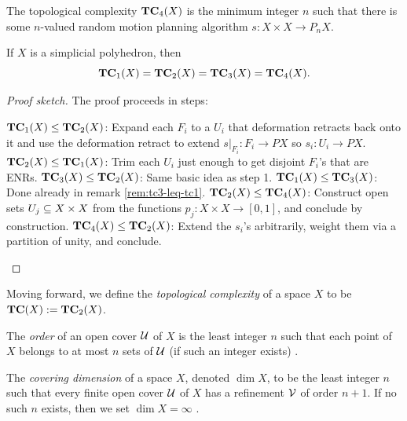 \begin{definition}
    The topological complexity $\operatorname{\mathbf{TC}}_4(X)$ is the minimum integer $n$ such that there is some $n$-valued random motion planning algorithm $s : X \times X \to P_n X$.
\end{definition}

\begin{theorem}
    If $X$ is a simplicial polyhedron, then
    \[
        \operatorname{\mathbf{TC}}_1(X) = \operatorname{\mathbf{TC}}_2(X) = \operatorname{\mathbf{TC}}_3(X) = \operatorname{\mathbf{TC}}_4(X).
    \]
    \begin{proof}[Proof sketch]
        The proof proceeds in steps:

        \begin{enumerate}[Step]
             $\operatorname{\mathbf{TC}}_1(X) \leq \operatorname{\mathbf{TC}}_2(X)$:
                Expand each $F_i$ to a $U_i$ that deformation retracts back onto it and use the deformation retract to extend $s |_{F_i} : F_i \to PX$ so $s_i : U_i \to PX$.
             $\operatorname{\mathbf{TC}}_2(X) \leq \operatorname{\mathbf{TC}}_1(X)$:
                Trim each $U_i$ just enough to get disjoint $F_i$'s that are ENRs.
             $\operatorname{\mathbf{TC}}_3(X) \leq \operatorname{\mathbf{TC}}_2(X)$:
                Same basic idea as step 1.
             $\operatorname{\mathbf{TC}}_1(X) \leq \operatorname{\mathbf{TC}}_3(X)$:
                Done already in remark \ref{rem:tc3-leq-tc1}.
             $\operatorname{\mathbf{TC}}_2(X) \leq \operatorname{\mathbf{TC}}_4(X)$:
                Construct open sets $U_j \subseteq X \times X$ from the functions $p_j : X \times X \to [0,1]$, and conclude by construction.
             $\operatorname{\mathbf{TC}}_4(X) \leq \operatorname{\mathbf{TC}}_2(X)$:
                Extend the $s_i$'s arbitrarily, weight them via a partition of unity, and conclude.
        \end{enumerate}
    \end{proof}
\end{theorem}

\begin{definition}\label{def:tc}
    Moving forward, we define the \emph{topological complexity} of a space $X$ to be $\operatorname{\mathbf{TC}}(X) := \operatorname{\mathbf{TC}}_2(X)$.
\end{definition}

\begin{definition}
    The \emph{order} of an open cover $\mathcal{U}$ of $X$ is the least integer $n$ such that each point of $X$ belongs to at most $n$ sets of $\mathcal{U}$ (if such an integer exists) \cite{wikipedia:covering-dimension}.
\end{definition}

\begin{definition}
    The \emph{covering dimension} of a space $X$, denoted $\dim X$, to be the least integer $n$ such that every finite open cover $\mathcal{U}$ of $X$ has a refinement $\mathcal{V}$ of order $n+1$.
    If no such $n$ exists, then we set $\dim X = \infty$ \cite{wikipedia:covering-dimension}.
\end{definition}


